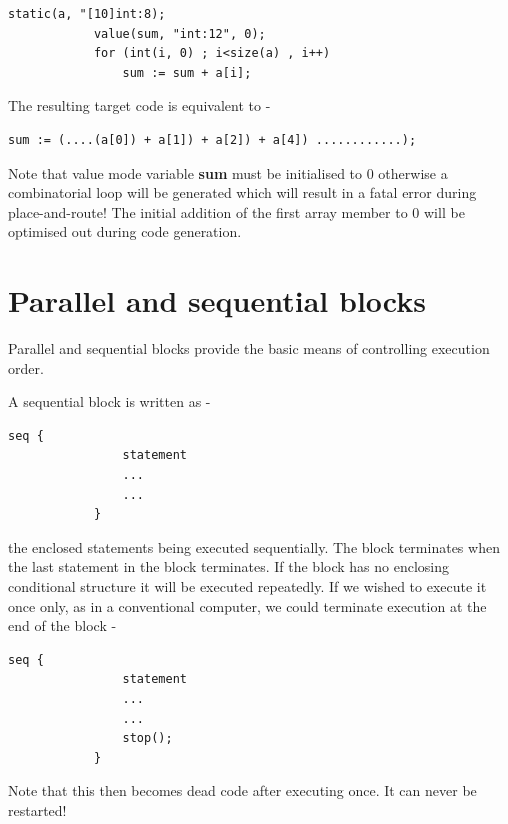         \begin{lstlisting}[language=threepl]
            static(a, "[10]int:8);
            value(sum, "int:12", 0);
            for (int(i, 0) ; i<size(a) , i++)
                sum := sum + a[i];
        \end{lstlisting}

        The resulting target code is equivalent to -
        
        \begin{lstlisting}[language=threepl]
            sum := (....(a[0]) + a[1]) + a[2]) + a[4]) ............);
        \end{lstlisting}
        
        Note that value mode variable {\bf sum} must be initialised to 0
        otherwise a combinatorial loop will be generated which will result in a
        fatal error during place-and-route! The initial addition of the first
        array member to 0 will be optimised out during code generation.






    \section{Parallel and sequential blocks}

        Parallel and sequential blocks provide the basic means of controlling execution
        order.

        A sequential block is written as -
        \begin{lstlisting}[language=threepl]
            seq {
                statement
                ...
                ...
            }
        \end{lstlisting}
        the enclosed statements being executed sequentially. The block terminates when
        the last statement in the block terminates.
        If the  block
        has no enclosing conditional structure it will be executed repeatedly. If we
        wished to execute it once only, as in a conventional computer, we could
        terminate execution at the end of the block -
        \begin{lstlisting}[language=threepl]
            seq {
                statement
                ...
                ...
                stop();
            }
        \end{lstlisting}
        Note that this then becomes dead code after executing once. It can never
        be restarted!

